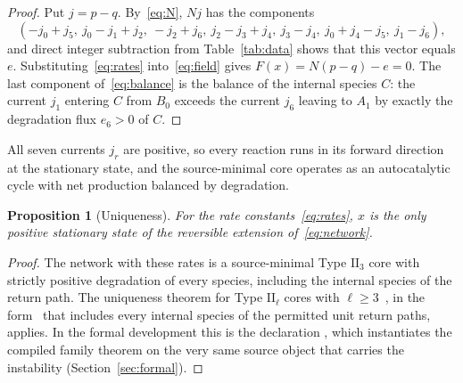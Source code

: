 \documentclass[11pt,a4paper]{article}
\theoremstyle{plain}
\newtheorem{proposition}[theorem]{Proposition}
\theoremstyle{definition}
\theoremstyle{remark}
\numberwithin{equation}{section}
\newcommand{\II}{\mathrm{II}}
\begin{document}
\begin{proof}
Put $j=p-q$. By~\eqref{eq:N}, $Nj$ has the components
\begin{equation}\label{eq:balance}
(-j_0+j_5,\ j_0-j_1+j_2,\ -j_2+j_6,\ j_2-j_3+j_4,\ j_3-j_4,\ j_0+j_4-j_5,\ j_1-j_6),
\end{equation}
and direct integer subtraction from Table~\ref{tab:data} shows that this vector equals $e$. Substituting~\eqref{eq:rates} into~\eqref{eq:field} gives $F(x)=N(p-q)-e=0$. The last component of~\eqref{eq:balance} is the balance of the internal species $C$: the current $j_1$ entering $C$ from $B_0$ exceeds the current $j_6$ leaving to $A_1$ by exactly the degradation flux $e_6>0$ of $C$.
\end{proof}

All seven currents $j_r$ are positive, so every reaction runs in its forward direction at the stationary state, and the source-minimal core operates as an autocatalytic cycle with net production balanced by degradation.

\begin{proposition}[Uniqueness]\label{prop:unique}
For the rate constants~\eqref{eq:rates}, $x$ is the only positive stationary state of the reversible extension of~\eqref{eq:network}.
\end{proposition}

\begin{proof}
The network with these rates is a source-minimal Type $\II_3$ core with strictly positive degradation of every species, including the internal species of the return path. The uniqueness theorem for Type $\II_\ell$ cores with $\ell\ge3$~\cite{TypeIIpos}, in the form~\cite[Theorem~1.1]{TypeIImixed} that includes every internal species of the permitted unit return paths, applies. In the formal development this is the declaration , which instantiates the compiled family theorem  on the very same source object that carries the instability (Section~\ref{sec:formal}).
\end{proof}
\end{document}
